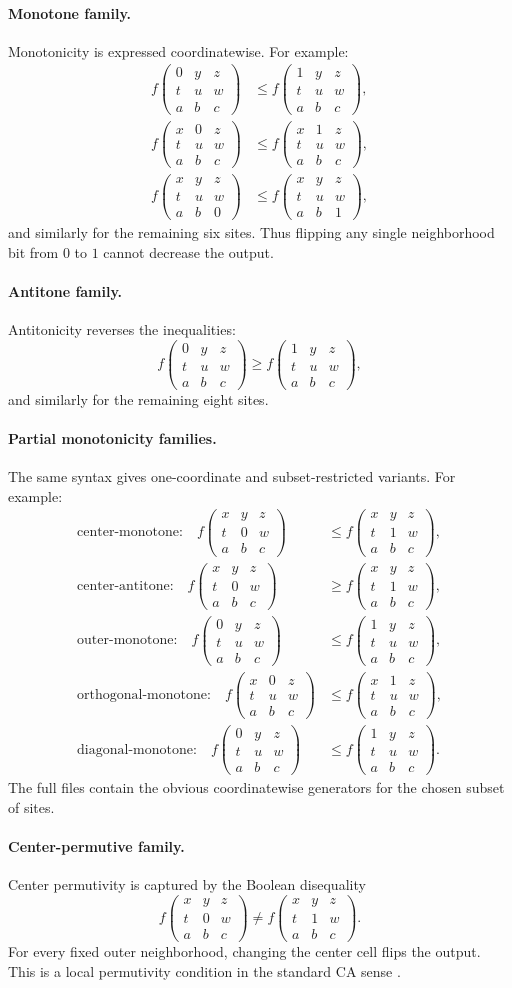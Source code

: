 \documentclass[11pt,a4paper]{article}
\newcommand{\nbhd}[9]{%
  \begin{smallmatrix}
  #1 & #2 & #3 \\
  #4 & #5 & #6 \\
  #7 & #8 & #9
  \end{smallmatrix}
}
\newcommand{\F}[1]{f\!\left(#1\right)}
\begin{document}
\paragraph{Monotone family.}
Monotonicity is expressed coordinatewise.  For example:
\begin{align*}
\F{\nbhd{0}{y}{z}{t}{u}{w}{a}{b}{c}}
&\le
\F{\nbhd{1}{y}{z}{t}{u}{w}{a}{b}{c}},\\
\F{\nbhd{x}{0}{z}{t}{u}{w}{a}{b}{c}}
&\le
\F{\nbhd{x}{1}{z}{t}{u}{w}{a}{b}{c}},\\
\F{\nbhd{x}{y}{z}{t}{u}{w}{a}{b}{0}}
&\le
\F{\nbhd{x}{y}{z}{t}{u}{w}{a}{b}{1}},
\end{align*}
and similarly for the remaining six sites.  Thus flipping any single neighborhood bit from
\(0\) to \(1\) cannot decrease the output.

\paragraph{Antitone family.}
Antitonicity reverses the inequalities:
\[
\F{\nbhd{0}{y}{z}{t}{u}{w}{a}{b}{c}}
\ge
\F{\nbhd{1}{y}{z}{t}{u}{w}{a}{b}{c}},
\]
and similarly for the remaining eight sites.

\paragraph{Partial monotonicity families.}
The same syntax gives one-coordinate and subset-restricted variants.  For example:
\begin{align*}
\text{center-monotone:}\quad
\F{\nbhd{x}{y}{z}{t}{0}{w}{a}{b}{c}}
&\le
\F{\nbhd{x}{y}{z}{t}{1}{w}{a}{b}{c}},\\
\text{center-antitone:}\quad
\F{\nbhd{x}{y}{z}{t}{0}{w}{a}{b}{c}}
&\ge
\F{\nbhd{x}{y}{z}{t}{1}{w}{a}{b}{c}},\\
\text{outer-monotone:}\quad
\F{\nbhd{0}{y}{z}{t}{u}{w}{a}{b}{c}}
&\le
\F{\nbhd{1}{y}{z}{t}{u}{w}{a}{b}{c}},\\
\text{orthogonal-monotone:}\quad
\F{\nbhd{x}{0}{z}{t}{u}{w}{a}{b}{c}}
&\le
\F{\nbhd{x}{1}{z}{t}{u}{w}{a}{b}{c}},\\
\text{diagonal-monotone:}\quad
\F{\nbhd{0}{y}{z}{t}{u}{w}{a}{b}{c}}
&\le
\F{\nbhd{1}{y}{z}{t}{u}{w}{a}{b}{c}}.
\end{align*}
The full files contain the obvious coordinatewise generators for the chosen subset of sites.

\paragraph{Center-permutive family.}
Center permutivity is captured by the Boolean disequality
\[
\F{\nbhd{x}{y}{z}{t}{0}{w}{a}{b}{c}}
\neq
\F{\nbhd{x}{y}{z}{t}{1}{w}{a}{b}{c}}.
\]
For every fixed outer neighborhood, changing the center cell flips the output.  This is a local
permutivity condition in the standard CA sense \cite{AlloucheSkordev2003}.
\end{document}
